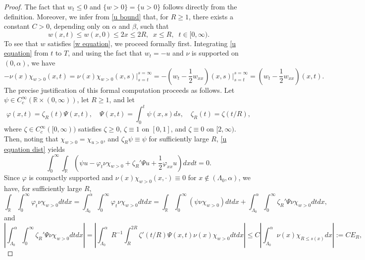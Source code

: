 \documentclass{article}
\numberwithin{equation}{section}
\numberwithin{figure}{section}
\theoremstyle{plain}
\theoremstyle{plain}
\theoremstyle{plain}
\theoremstyle{plain}
\theoremstyle{definition}
\theoremstyle{remark}
\def\R{{\mathbb{R}}}
\begin{document}
\begin{proof} The fact that $w_t \leq 0$ and $\{w>0\}=\{u>0\}$ follows directly from the definition. Moreover, we infer from \eqref{u bound} that, for $R \geq 1$, there exists a constant $C>0$, depending only on $\alpha$ and $\beta$, such that
\begin{equation}
 w(x,t)\leq w(x,0)\leq 2x\leq 2R, \;\;x\leq R,\;\; t\in [0,\infty).  
\end{equation}
To see that $w$ satisfies \eqref{w equation}, we proceed formally first. Integrating \eqref{u equation} from $t$ to $T$, and using the fact that $w_t=-u$ and $\nu$ is supported on $(0,\alpha)$, we have
\begin{equation}
-\nu(x)\chi_{w>0}(x,t)=\nu(x)\chi_{w>0}(x,s)\Bigr\rvert_{s=t}^{s=\infty} =-\left(w_t-\frac12w_{xx}\right) (x,s)\Biggr \rvert_{s=t}^{s=\infty}=\left(w_t-\frac12w_{xx}\right)(x,t). 
\end{equation}
The precise justification of this formal computation proceeds as follows. Let $\psi\in C^{\infty}_c(\R \times(0,\infty))$, let $R\geq 1$, and let 
\[ \varphi(x,t)= \zeta_R(t)\Psi(x,t), \quad \Psi(x,t)=\int_0^t\psi(x,s)ds, \quad  \zeta_R(t)=\zeta(t/R),\] where $\zeta\in C^{\infty}_c([0,\infty))$ satisfies $\zeta\geq0$, $\zeta \equiv 1$  on $[0,1]$, and $\zeta \equiv 0$ on $[2,\infty)$. Then, noting that $\chi_{w>0}=\chi_{u>0}$, and
$\zeta_R\psi \equiv \psi$ for sufficiently large $R$, \eqref{u equation dist} yields
\begin{equation} \label{opsequjf1}
     \int_{0}^{\infty}\int_{\R} \left( \psi u-\varphi_t\nu \chi_{w>0}+\zeta_R'\Psi u+\frac{1}{2}\varphi_{xx}u\right)dxdt=0.
\end{equation}
Since $\varphi$ is compactly supported and $\nu(x)\chi_{w>0}(x,\cdot)\equiv 0$ for $x\notin (\Lambda_0,\alpha)$, we have, for sufficiently large $R$,
\begin{equation} \label{opsequjf2}
    \int_{\R} \int_{0}^{\infty} \varphi_t\nu \chi_{w>0}dtdx=\int_{\Lambda_0}^{\alpha}  \int_{0}^{\infty} \varphi_t\nu \chi_{w>0}dtdx=\int_\R  \int_{0}^{\infty} (\psi\nu \chi_{w>0})dtdx+\int_{\Lambda_0}^{\alpha}\int_{0}^{\infty} \zeta_R'\Psi\nu \chi_{w>0}dtdx,
\end{equation}
and
\begin{equation}\label{opsequjf3}
\left|\int_{\Lambda_0}^{\alpha}\int_{0}^{\infty} \zeta_R'\Psi\nu \chi_{w>0} dtdx\right|=\left| \int_{\Lambda_0}^{\alpha}R^{-1}\int_{R}^{2R}\zeta'(t/R)\Psi(x,t)\nu(x)\chi_{w>0} dtdx \right|\leq C 
\left|\int_{\Lambda_0}^{\alpha} \nu(x)\chi_{R\leq s(x)}dx\right|:=CE_R,

\end{equation}
\end{proof}
\end{document}
